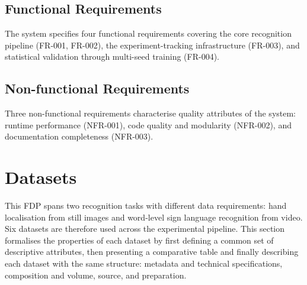 \subsection{Functional Requirements}
\label{sec:functional_requirements}

The system specifies four functional requirements covering the core recognition pipeline (FR-001,
FR-002), the experiment-tracking infrastructure (FR-003), and statistical validation through
multi-seed training (FR-004).

\FloatBarrier

\subsection{Non-functional Requirements}
\label{sec:non_functional_requirements}

Three non-functional requirements characterise quality attributes of the system: runtime
performance (NFR-001), code quality and modularity (NFR-002), and documentation completeness
(NFR-003).

\FloatBarrier

\section{Datasets}
\label{sec:datasets}

This FDP spans two recognition tasks with different data requirements: hand localisation from still
images and word-level sign language recognition from video. Six datasets are therefore used across
the experimental pipeline. This section formalises the properties of each dataset by first defining
a common set of descriptive attributes, then presenting a comparative table and finally describing
each dataset with the same structure: metadata and technical specifications, composition and
volume, source, and preparation.

